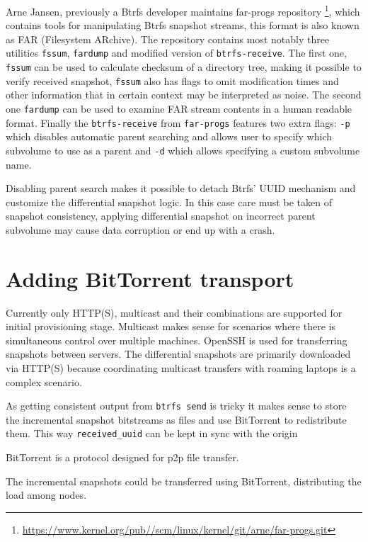 \documentclass[a4paper,11pt]{kth-mag}
\begin{document}
Arne Jansen, previously a Btrfs developer maintains far-progs repository
\footnote{\url{https://www.kernel.org/pub//scm/linux/kernel/git/arne/far-progs.git}},
which contains tools for manipulating Btrfs snapshot streams,
this format is also known as FAR (Filesystem ARchive).
The repository contains most notably three utilities
\texttt{fssum}, \texttt{fardump} and modified version of \texttt{btrfs-receive}.
The first one, \texttt{fssum} can be used to calculate checksum of a
directory tree, making it possible to verify received snapshot,
\texttt{fssum} also has flags to omit modification times and other information that 
in certain context may be interpreted as noise.
The second one \texttt{fardump} can be used to examine FAR stream contents
in a human readable format.
Finally the \texttt{btrfs-receive} from \texttt{far-progs} features
two extra flags: \texttt{-p} which disables
automatic parent searching and allows user to specify which 
subvolume to use as a parent and \texttt{-d} which 
allows specifying a custom subvolume name.

Disabling parent search makes it possible to detach
Btrfs' UUID mechanism and customize the differential snapshot logic.
In this case care must be taken of snapshot consistency,
applying differential snapshot on incorrect parent subvolume
may cause data corruption or end up with a crash.

\section{Adding BitTorrent transport}

Currently only HTTP(S), multicast and their combinations are supported
for initial provisioning stage.
Multicast makes sense for scenarios where there is simultaneous
control over multiple machines.
OpenSSH is used for transferring snapshots between servers.
The differential snapshots are primarily downloaded
via HTTP(S) because coordinating multicast
transfers with roaming laptops is a complex scenario.

As getting consistent output from \texttt{btrfs send}
is tricky it makes sense to store the incremental snapshot
bitstreams as files and use BitTorrent to redistribute them.
This way \texttt{received\_uuid} can be kept in sync with the origin


BitTorrent is a protocol designed for \gls{p2p} file transfer.

The incremental snapshots could be transferred
using BitTorrent, distributing the load among
nodes.
\end{document}
